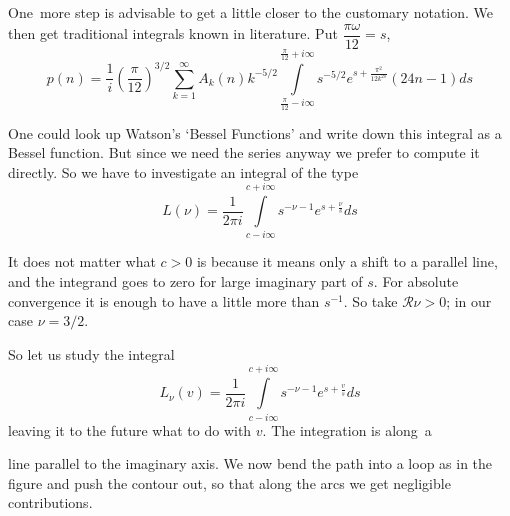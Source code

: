 One\pageoriginale\ more step is advisable to get a little closer to
the customary notation. We then get traditional integrals known in
literature. Put $\dfrac{\pi \omega}{12}=s$,
$$
p(n) = \frac{1}{i} \left(\frac{\pi}{12} \right)^{3/2}
\sum^\infty_{k=1} A_k (n) k^{-5/2} \int\limits^{\frac{\pi}{12} + i
  \infty}_{\frac{\pi}{12} - i \infty} s^{-5/2} e^{s+
  \frac{\pi^2}{12k^{2s}}} (24n-1) ds
$$

One could look up Watson's `Bessel Functions' and write down this
integral as a Bessel function. But since we need the series anyway we
prefer to compute it directly. So we have to investigate an integral
of the type
$$
L(\nu) = \frac{1}{2 \pi i} \int\limits^{c+ i \infty}_{c- i \infty}
s^{- \nu-1} e^{s + \frac{\nu}{s}} ds
$$

It does not matter what $c>0$ is because it means only a shift to a
parallel line, and the integrand goes to zero for large imaginary part
of $s$. For absolute convergence it is enough to have a little more
than $s^{-1}$. So take $\mathscr{R} \nu >0$; in our case $\nu = 3/2$. 

So let us study the integral
$$
L_\nu (v) = \frac{1}{2 \pi i} \int\limits^{c+ i \infty}_{c- i
  \infty} s^{- \nu -1} e^{s+ \frac{v}{s}} ds
$$
  leaving it to the future what to do with $v$. The integration is
  along\pageoriginale\ a 

\medskip
\noindent
\begin{minipage}{4cm}
  line parallel to the imaginary axis. We now bend
  the path into a loop as in the figure and push the contour out, so
  that along the arcs we get negligible contributions. 
\end{minipage}
\begin{minipage}{6cm}
  \begin{figure}[H]
  \end{figure}
\end{minipage}

